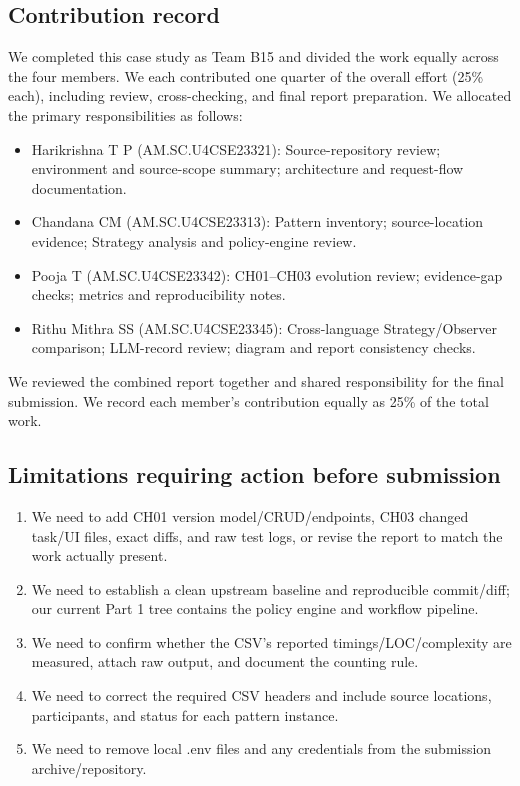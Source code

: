 \documentclass[11pt,a4paper]{article}
\begin{document}
\subsection{Contribution record}
We completed this case study as Team B15 and divided the work equally across the four members. We each contributed one quarter of the overall effort (25\% each), including review, cross-checking, and final report preparation. We allocated the primary responsibilities as follows:
\begin{itemize}[itemsep=2pt]
\item Harikrishna T P (AM.SC.U4CSE23321): Source-repository review; environment and source-scope summary; architecture and request-flow documentation.
\item Chandana CM (AM.SC.U4CSE23313): Pattern inventory; source-location evidence; Strategy analysis and policy-engine review.
\item Pooja T (AM.SC.U4CSE23342): CH01--CH03 evolution review; evidence-gap checks; metrics and reproducibility notes.
\item Rithu Mithra SS (AM.SC.U4CSE23345): Cross-language Strategy/Observer comparison; LLM-record review; diagram and report consistency checks.
\end{itemize}
We reviewed the combined report together and shared responsibility for the final submission. We record each member's contribution equally as 25\% of the total work.

\subsection{Limitations requiring action before submission}
\begin{enumerate}[itemsep=2pt]
\item We need to add CH01 version model/CRUD/endpoints, CH03 changed task/UI files, exact diffs, and raw test logs, or revise the report to match the work actually present.
\item We need to establish a clean upstream baseline and reproducible commit/diff; our current Part 1 tree contains the policy engine and workflow pipeline.
\item We need to confirm whether the CSV's reported timings/LOC/complexity are measured, attach raw output, and document the counting rule.
\item We need to correct the required CSV headers and include source locations, participants, and status for each pattern instance.
\item We need to remove local .env files and any credentials from the submission archive/repository.
\end{enumerate}
\end{document}
